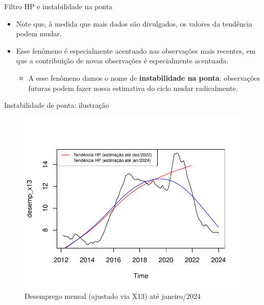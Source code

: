 \documentclass[11pt]{beamer}
\begin{document}
\begin{frame}{Filtro HP e instabilidade na ponta}
	\begin{itemize}
		\item Note que, à medida que mais dados são divulgados, os valores da tendência podem mudar.
		\item Esse fenômeno é especialmente acentuado nas observações mais recentes, em que a contribuição de novas observações é especialmente acentuada.
		\begin{itemize}
			\item A esse fenômeno damos o nome de \textbf{instabilidade na ponta}: observações futuras podem fazer nossa estimativa do ciclo mudar radicalmente.
		\end{itemize} 
	\end{itemize}
\end{frame}

\begin{frame}{Instabilidade de ponta: ilustração}
	\begin{figure}
		\caption{Desemprego mensal (ajustado via X13) até janeiro/2024}
		\includegraphics[scale=0.7]{graficos/instabilidade.pdf}
	\end{figure}
\end{frame}
\end{document}
